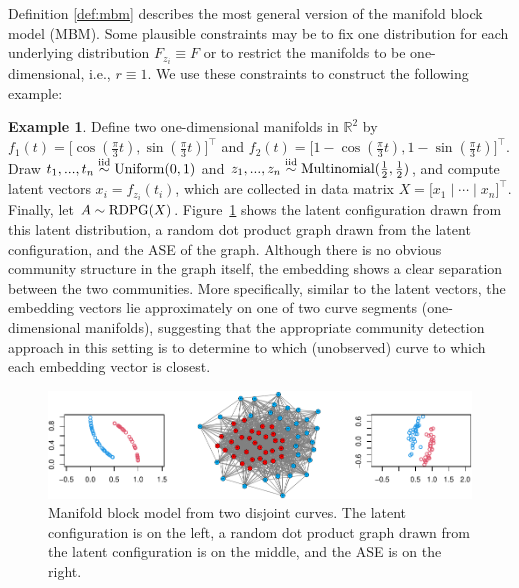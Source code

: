 \documentclass[
  12pt,
]{article}
\theoremstyle{definition}
\theoremstyle{definition}
\newtheorem{example}{Example}[section]
\theoremstyle{definition}
\theoremstyle{definition}
\theoremstyle{remark}
\begin{document}
Definition \ref{def:mbm} describes the most general version of the manifold block model (MBM).
Some plausible constraints may be to fix one distribution for each underlying distribution \(F_{z_i} \equiv F\) or to restrict the manifolds to be one-dimensional, i.e., \(r \equiv 1\).
We use these constraints to construct the following example:

\begin{example}
\label{ex:separated-curves}
Define two one-dimensional manifolds in $\mathbb{R}^2$ by $f_1(t) = \Big[ \cos(\frac{\pi}{3} t), \sin(\frac{\pi}{3} t) \Big]^\top$ and $f_2(t) = \Big[ 1 - \cos(\frac{\pi}{3} t), 1 - \sin(\frac{\pi}{3} t) \Big]^\top$.
Draw $t_1, ..., t_n \stackrel{\mathrm{iid}}{\sim} \mathrm{Uniform}(0, 1)$ and $z_1, ..., z_n \stackrel{\mathrm{iid}}{\sim} \mathrm{Multinomial}(\frac{1}{2}, \frac{1}{2})$, and compute latent vectors $x_i = f_{z_i}(t_i)$, which are collected in data matrix $X = \Big[ x_1 \mid \cdots \mid x_n \Big]^\top$. 
Finally, let $A \sim \mathrm{RDPG}(X)$. Figure~\ref{fig:two-curves} shows the latent configuration drawn from this latent distribution, a random dot product graph drawn from the latent configuration, and the ASE of the graph. 
Although there is no obvious community structure in the graph itself, the embedding shows a clear separation between the two communities. 
More specifically, similar to the latent vectors, the embedding vectors lie approximately on one of two curve segments (one-dimensional manifolds), suggesting that the appropriate community detection approach in this setting is to determine to which (unobserved) curve to which each embedding vector is closest. 

\begin{figure}[H]

{\centering \includegraphics{draft_files/figure-latex/two-curves-1} 

}

\caption{Manifold block model from two disjoint curves. The latent configuration is on the left, a random dot product graph drawn from the latent configuration is on the middle, and the ASE is on the right.}\label{fig:two-curves}
\end{figure}
\end{example}
\end{document}
